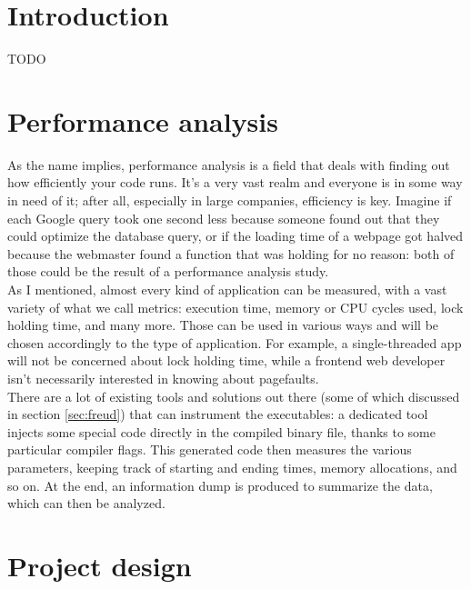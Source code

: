 \chapter{Introduction}

    TODO


\chapter{Performance analysis}


    As the name implies, performance analysis is a field that deals with finding out
    how efficiently your code runs. It's a very vast realm and everyone is in some
    way in need of it; after all, especially in large companies, efficiency is key. Imagine if
    each Google query took one second less because someone found out that they could
    optimize the database query, or if the loading time of a webpage got halved because the
    webmaster found a function that was holding for no reason: both of those could be the result
    of a performance analysis study.\\

    As I mentioned, almost every kind of application can be measured, with a vast variety of what we call metrics:
    execution time, memory or CPU cycles used, lock holding time, and many more. Those can be used in
    various ways and will be chosen accordingly to the type of application. For example, a single-threaded app
    will not be concerned about lock holding time, while a frontend web developer isn't 
    necessarily interested in knowing about pagefaults.\\

    There are a lot of existing tools and solutions out there (some of which discussed in section \ref{sec:freud})
    that can instrument the executables: a dedicated tool injects some special code directly in the compiled
    binary file, thanks to some particular compiler flags. This generated code then measures
    the various parameters, keeping track of starting and ending times, memory allocations, and so on.
    At the end, an information dump is produced to summarize the data, which can then be analyzed.


\chapter{Project design}

